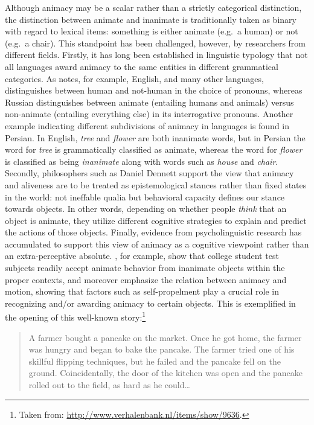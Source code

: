 Although animacy may be a scalar rather than a strictly categorical distinction\autocites[See e.g.\ the animacy hierarchy in][]{comrie:1989}[and research such as][]{rosenbach:2008}, the distinction between animate and inanimate is traditionally taken as binary with regard to lexical items: something is either animate (e.g.\ a human) or not (e.g.\ a chair). This standpoint has been challenged, however, by researchers from different fields. Firstly, it has long been established in linguistic typology that not all languages award animacy to the same entities in different grammatical categories. As \citeauthor{comrie:1989} notes, for example, English, and many other languages, distinguishes between human and not-human in the choice of pronouns, whereas Russian distinguishes between animate (entailing humans and animals) versus non-animate (entailing everything else) in its interrogative pronouns\autocite{comrie:1989}. Another example indicating different subdivisions of animacy in languages is found in Persian. In English, \emph{tree} and \emph{flower} are both inanimate words, but in Persian the word for \emph{tree} is grammatically classified as animate, whereas the word for \emph{flower} is classified as being \emph{inanimate} along with words such as \emph{house} and \emph{chair}.\autocite[211]{wiese:2003} Secondly, philosophers such as Daniel Dennett support the view that animacy and aliveness are to be treated as epistemological stances rather than fixed states in the world: not ineffable qualia but behavioral capacity defines our stance towards objects\autocite{dennett:1996}. In other words, depending on whether people \textit{think} that an object is animate, they utilize different cognitive strategies to explain and predict the actions of those objects. Finally, evidence from psycholinguistic research has accumulated to support this view of animacy as a cognitive viewpoint rather than an extra-perceptive absolute. \citeauthor{nieuwland:2005}, for example, show that college student test subjects readily accept animate behavior from inanimate objects within the proper contexts\autocite{nieuwland:2005}, and \citeauthor{vogels:2013} moreover emphasize the relation between animacy and motion, showing that factors such as self-propelment play a crucial role in recognizing and/or awarding animacy to certain objects\autocite{vogels:2013}. This is exemplified in the opening of this well-known story:\footnote{Taken from: \url{http://www.verhalenbank.nl/items/show/9636}.}
\begin{quote} 
    A farmer bought a pancake on the market. Once he got home, the farmer was hungry and began to bake the pancake. The farmer tried one of his skillful flipping techniques, but he failed and the pancake fell on the ground. Coincidentally, the door of the kitchen was open and the pancake rolled out to the field, as hard as he could\ldots
\end{quote}
